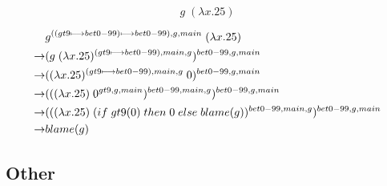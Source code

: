 \documentclass[12pt]{article}	%
\begin{document}
$$g \; (\lambda x.25)$$

\begin{align*}
& g^{((gt9\longmapsto bet0-99)\longmapsto bet0-99),g,main} \;(\lambda x.25) \\
\rightarrow & (g\; (\lambda x.25)^{(gt9\longmapsto bet0-99),main,g} )^{bet0-99,g,main}  \\
\rightarrow & ( (\lambda x.25)^{(gt9\longmapsto bet0-99),main,g} \;0)^{bet0-99,g,main}  \\
\rightarrow & ( ((\lambda x.25)\; 0^{gt9,g,main} )^{bet0-99,main,g} )^{bet0-99,g,main}  \\
\rightarrow & ( ((\lambda x.25)\;(if\;gt9(0)\;then\;0\;else\; blame(g))^{bet0-99,main,g} )^{bet0-99,g,main}  \\
\rightarrow &blame(g)
\end{align*}
















\subsection*{Other}
\end{document}
